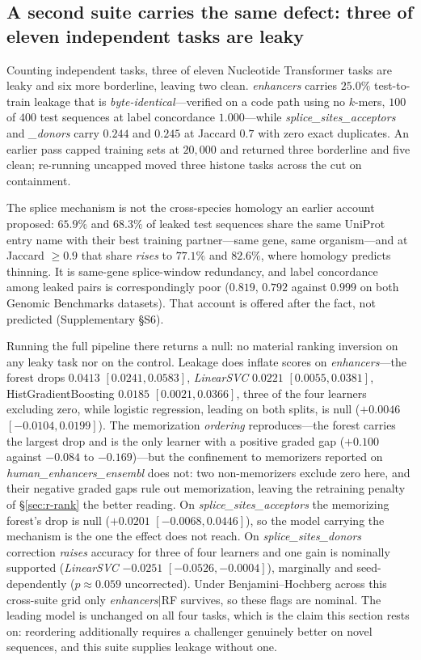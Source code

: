 \documentclass[webpdf,modern,large,namedate]{oup-authoring-template}%
\begin{document}
\subsection{A second suite carries the same defect: three of eleven independent tasks are leaky}\label{sec:r-census}
Counting independent tasks, three of eleven Nucleotide Transformer tasks are leaky and six more borderline, leaving two clean. \textit{enhancers} carries $25.0\%$ test-to-train leakage that is \emph{byte-identical}---verified on a code path using no $k$-mers, $100$ of $400$ test sequences at label concordance $1.000$---while \textit{splice\_sites\_acceptors} and \textit{\_donors} carry $0.244$ and $0.245$ at Jaccard $0.7$ with zero exact duplicates. An earlier pass capped training sets at $20{,}000$ and returned three borderline and five clean; re-running uncapped moved three histone tasks across the cut on containment.

The splice mechanism is not the cross-species homology an earlier account proposed: $65.9\%$ and $68.3\%$ of leaked test sequences share the same UniProt entry name with their best training partner---same gene, same organism---and at Jaccard $\ge0.9$ that share \emph{rises} to $77.1\%$ and $82.6\%$, where homology predicts thinning. It is same-gene splice-window redundancy, and label concordance among leaked pairs is correspondingly poor ($0.819$, $0.792$ against $0.999$ on both Genomic Benchmarks datasets). That account is offered after the fact, not predicted (Supplementary \S S6).

Running the full pipeline there returns a null: no material ranking inversion on any leaky task nor on the control. Leakage does inflate scores on \textit{enhancers}---the forest drops $0.0413$ $[0.0241,0.0583]$, \textit{LinearSVC} $0.0221$ $[0.0055,0.0381]$, HistGradientBoosting $0.0185$ $[0.0021,0.0366]$, three of the four learners excluding zero, while logistic regression, leading on both splits, is null ($+0.0046$ $[-0.0104,0.0199]$). The memorization \emph{ordering} reproduces---the forest carries the largest drop and is the only learner with a positive graded gap ($+0.100$ against $-0.084$ to $-0.169$)---but the confinement to memorizers reported on \textit{human\_enhancers\_ensembl} does not: two non-memorizers exclude zero here, and their negative graded gaps rule out memorization, leaving the retraining penalty of \S\ref{sec:r-rank} the better reading. On \textit{splice\_sites\_acceptors} the memorizing forest's drop is null ($+0.0201$ $[-0.0068,0.0446]$), so the model carrying the mechanism is the one the effect does not reach. On \textit{splice\_sites\_donors} correction \emph{raises} accuracy for three of four learners and one gain is nominally supported (\textit{LinearSVC} $-0.0251$ $[-0.0526,-0.0004]$), marginally and seed-dependently ($p\approx0.059$ uncorrected). Under Benjamini--Hochberg across this cross-suite grid only \textit{enhancers}$|$RF survives, so these flags are nominal. The leading model is unchanged on all four tasks, which is the claim this section rests on: reordering additionally requires a challenger genuinely better on novel sequences, and this suite supplies leakage without one.
\end{document}
